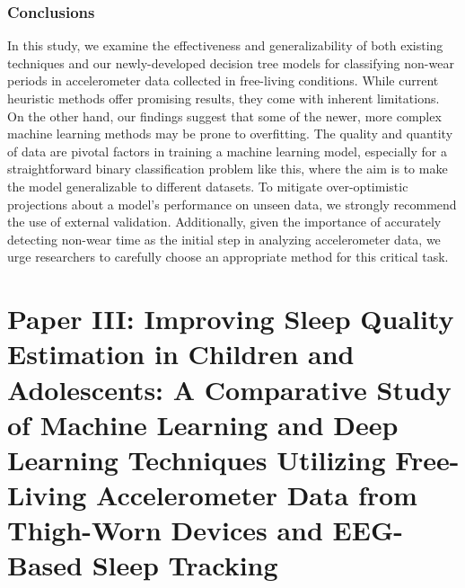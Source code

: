 \documentclass[
  10pt,
]{scrbook}
\begin{document}
\hypertarget{conclusions-1}{%
\subsection{Conclusions}\label{conclusions-1}}

In this study, we examine the effectiveness and generalizability of both
existing techniques and our newly-developed decision tree models for
classifying non-wear periods in accelerometer data collected in
free-living conditions. While current heuristic methods offer promising
results, they come with inherent limitations. On the other hand, our
findings suggest that some of the newer, more complex machine learning
methods may be prone to overfitting. The quality and quantity of data
are pivotal factors in training a machine learning model, especially for
a straightforward binary classification problem like this, where the aim
is to make the model generalizable to different datasets. To mitigate
over-optimistic projections about a model's performance on unseen data,
we strongly recommend the use of external validation. Additionally,
given the importance of accurately detecting non-wear time as the
initial step in analyzing accelerometer data, we urge researchers to
carefully choose an appropriate method for this critical task.

\newpage

\hypertarget{paper-iii-improving-sleep-quality-estimation-in-children-and-adolescents-a-comparative-study-of-machine-learning-and-deep-learning-techniques-utilizing-free-living-accelerometer-data-from-thigh-worn-devices-and-eeg-based-sleep-tracking}{%
\chapter{Paper III: Improving Sleep Quality Estimation in Children and
Adolescents: A Comparative Study of Machine Learning and Deep Learning
Techniques Utilizing Free-Living Accelerometer Data from Thigh-Worn
Devices and EEG-Based Sleep
Tracking}\label{paper-iii-improving-sleep-quality-estimation-in-children-and-adolescents-a-comparative-study-of-machine-learning-and-deep-learning-techniques-utilizing-free-living-accelerometer-data-from-thigh-worn-devices-and-eeg-based-sleep-tracking}}
\end{document}
